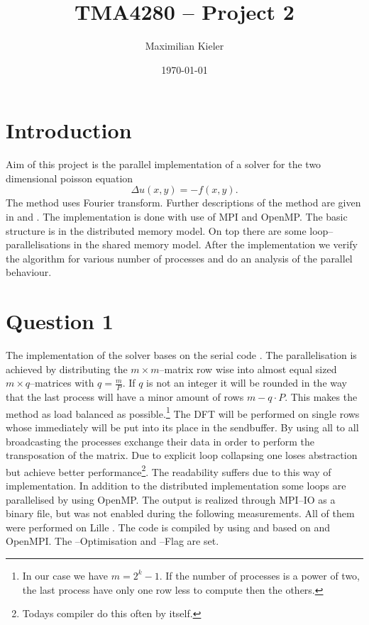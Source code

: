 







\title{TMA4280 -- Project 2}
\author{Maximilian Kieler}
\date{\today}

\maketitle


\section*{Introduction}

Aim of this project is the parallel implementation of a solver for the two dimensional poisson equation
\begin{equation}
	\Delta u(x,y) = -f(x,y).
\end{equation}
The method uses Fourier transform. Further descriptions of the method are given in \cite{script} and \cite{task}. The implementation is done with use of MPI and OpenMP. The basic structure is in the distributed memory model. On top there are some loop--parallelisations in the shared memory model. After the implementation we verify the algorithm for various number of processes and do an analysis of the parallel behaviour.



\section*{Question 1}

The implementation of the solver bases on the serial code \cite{script}. The parallelisation is achieved by distributing the $m \times m$--matrix row wise into almost equal sized $m \times q$--matrices with $q = \frac{m}{P}$. If $q$ is not an integer it will be rounded in the way that the last process will have a minor amount of rows $m - q \cdot P$. This makes the method as load balanced as possible.\footnote{In our case we have $m=2^k -1$. If the number of processes is a power of two, the last process have only one row less to compute then the others.} The DFT will be performed on single rows whose immediately will be put into its place in the sendbuffer. By using all to all broadcasting the processes exchange their data in order to perform the transposation of the matrix. Due to explicit loop collapsing one loses abstraction but achieve better performance\footnote{Todays compiler do this often by itself.}. The readability suffers due to this way of implementation. In addition to the distributed implementation some loops are parallelised by using OpenMP. The output is realized through MPI--IO as a binary file, but was not enabled during the following measurements. All of them were performed on Lille \cite{lille}. The code is compiled by using  and  based on  and OpenMPI. The --Optimisation and --Flag are set.


